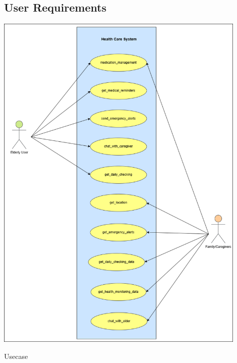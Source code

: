 \subsection{User Requirements}
\begin{minipage}{\textwidth}
        \centering
        \includegraphics[width=0.9\textwidth]{usecase.drawio.png}
        \caption{Usecase}
        \label{fig:usecase}
    \end{minipage}\\
    
